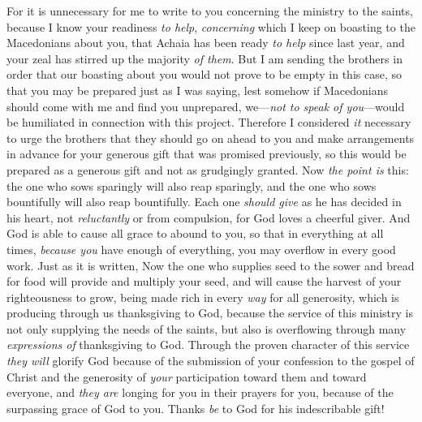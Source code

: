\begin{biblechapter} %
 For it is unnecessary for me to write to you concerning the ministry to the saints,
\verse because I know your readiness \textit{to help}, \textit{concerning} which I keep on boasting to the Macedonians about you, that Achaia has been ready \textit{to help} since last year, and your zeal has stirred up the majority \textit{of them}.
\verse But I am sending the brothers in order that our boasting about you would not prove to be empty in this case, so that you may be prepared just as I was saying,
\verse lest somehow if Macedonians should come with me and find you unprepared, we—\textit{not to speak of you}—would be humiliated in connection with this project.
\verse Therefore I considered \textit{it} necessary to urge the brothers that they should go on ahead to you and make arrangements in advance for your generous gift that was promised previously, so this would be prepared as a generous gift and not as grudgingly granted.
\verse Now \textit{the point is} this: the one who sows sparingly will also reap sparingly, and the one who sows bountifully will also reap bountifully.
\verse Each one \textit{should give} as he has decided in his heart, not \textit{reluctantly} or from compulsion, for God loves a cheerful giver.
\verse And God is able to cause all grace to abound to you, so that in everything at all times, \textit{because you} have enough of everything, you may overflow in every good work.
\verse Just as it is written,
\verse Now the one who supplies seed to the sower and bread for food will provide and multiply your seed, and will cause the harvest of your righteousness to grow,
\verse being made rich in every \textit{way} for all generosity, which is producing through us thanksgiving to God,
\verse because the service of this ministry is not only supplying the needs of the saints, but also is overflowing through many \textit{expressions of} thanksgiving to God.
\verse Through the proven character of this service \textit{they will} glorify God because of the submission of your confession to the gospel of Christ and the generosity of \textit{your} participation toward them and toward everyone,
\verse and \textit{they are} longing for you in their prayers for you, because of the surpassing grace of God to you.
\verse Thanks \textit{be} to God for his indescribable gift!
\end{biblechapter}

